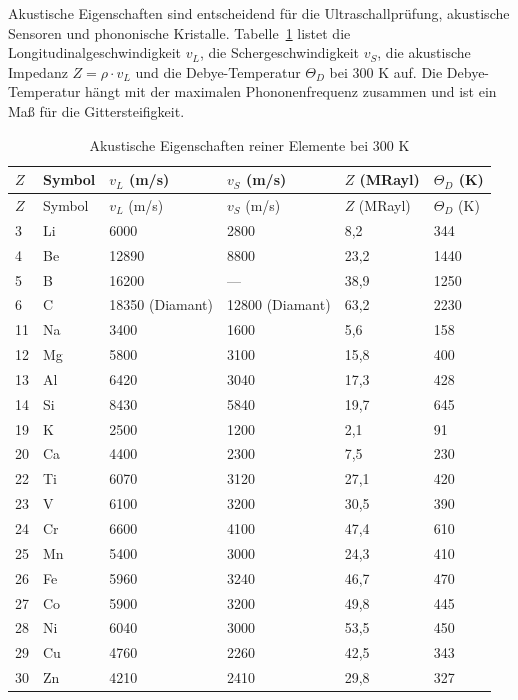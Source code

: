 \documentclass[12pt,a4paper]{article}
\begin{document}
	Akustische Eigenschaften sind entscheidend für die Ultraschallprüfung, akustische Sensoren und phononische Kristalle. Tabelle~\ref{tab:acoustic-properties-func} listet die Longitudinalgeschwindigkeit \(v_L\), die Schergeschwindigkeit \(v_S\), die akustische Impedanz \(Z = \rho \cdot v_L\) und die Debye-Temperatur \(\Theta_D\) bei 300 K auf. Die Debye-Temperatur hängt mit der maximalen Phononenfrequenz zusammen und ist ein Maß für die Gittersteifigkeit.
	
	\begin{longtable}{p{0.8cm}p{1.2cm}p{2.2cm}p{2.2cm}p{2.2cm}p{2.2cm}}
		\caption{Akustische Eigenschaften reiner Elemente bei 300 K} \label{tab:acoustic-properties-func} \\
		\toprule
		\(Z\) & Symbol & \(v_L\) (m/s) & \(v_S\) (m/s) & \(Z\) (MRayl) & \(\Theta_D\) (K) \\
		\midrule
		\endfirsthead
		\toprule
		\(Z\) & Symbol & \(v_L\) (m/s) & \(v_S\) (m/s) & \(Z\) (MRayl) & \(\Theta_D\) (K) \\
		\midrule
		\endhead
		3  & Li & 6000 & 2800 & 8,2 & 344 \\
		4  & Be & 12890 & 8800 & 23,2 & 1440 \\
		5  & B  & 16200 & --- & 38,9 & 1250 \\
		6  & C  & 18350 (Diamant) & 12800 (Diamant) & 63,2 & 2230 \\
		11 & Na & 3400 & 1600 & 5,6 & 158 \\
		12 & Mg & 5800 & 3100 & 15,8 & 400 \\
		13 & Al & 6420 & 3040 & 17,3 & 428 \\
		14 & Si & 8430 & 5840 & 19,7 & 645 \\
		19 & K  & 2500 & 1200 & 2,1 & 91 \\
		20 & Ca & 4400 & 2300 & 7,5 & 230 \\
		22 & Ti & 6070 & 3120 & 27,1 & 420 \\
		23 & V  & 6100 & 3200 & 30,5 & 390 \\
		24 & Cr & 6600 & 4100 & 47,4 & 610 \\
		25 & Mn & 5400 & 3000 & 24,3 & 410 \\
		26 & Fe & 5960 & 3240 & 46,7 & 470 \\
		27 & Co & 5900 & 3200 & 49,8 & 445 \\
		28 & Ni & 6040 & 3000 & 53,5 & 450 \\
		29 & Cu & 4760 & 2260 & 42,5 & 343 \\
		30 & Zn & 4210 & 2410 & 29,8 & 327 \\

\end{longtable}
\end{document}
